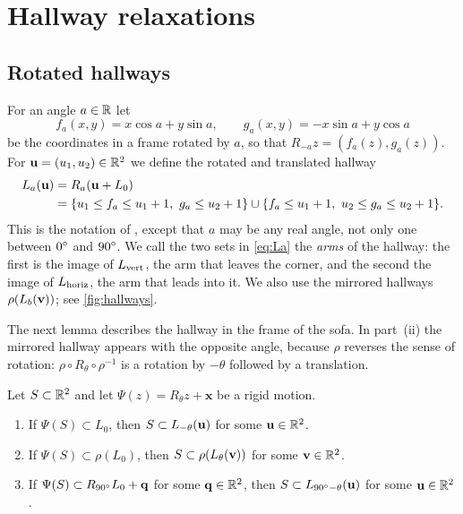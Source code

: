 \section{Hallway relaxations}\label{sec:relaxations}

\subsection{Rotated hallways}

For an angle $a\in\mathbb{R}$ let
\[
f_a(x,y)=x\cos a+y\sin a, \qquad g_a(x,y)=-x\sin a+y\cos a
\]
be the coordinates in a frame rotated by $a$, so that $R_{-a}z=(f_a(z),g_a(z))$. For $\mathbf{u}=(u_1,u_2)\in\mathbb{R}^2$ we define the rotated and translated hallway
\begin{equation}\label{eq:La}
\begin{split}
L_a(\mathbf{u})&=R_a(\mathbf{u}+L_0)\\
&=\{u_1\le f_a\le u_1+1,\ g_a\le u_2+1\}\cup\{f_a\le u_1+1,\ u_2\le g_a\le u_2+1\}.
\end{split}
\end{equation}
This is the notation of \cite{kallusromik2018}, except that $a$ may be any real angle, not only one between $0^{\circ}$ and $90^{\circ}$. We call the two sets in \eqref{eq:La} the \emph{arms} of the hallway: the first is the image of $L_{\mathrm{vert}}$, the arm that leaves the corner, and the second the image of $L_{\mathrm{horiz}}$, the arm that leads into it. We also use the mirrored hallways $\rho(L_b(\mathbf{v}))$; see \cref{fig:hallways}.

The next lemma describes the hallway in the frame of the sofa. In part~(ii) the mirrored hallway appears with the opposite angle, because $\rho$ reverses the sense of rotation: $\rho\circ R_\theta\circ\rho^{-1}$ is a rotation by $-\theta$ followed by a translation.

\begin{lem}\label{lem:frame}
Let $S\subset\mathbb{R}^2$ and let $\Psi(z)=R_\theta z+\mathbf{x}$ be a rigid motion.
\begin{enumerate}[label=(\roman*)]
\item If $\Psi(S)\subset L_0$, then $S\subset L_{-\theta}(\mathbf{u})$ for some $\mathbf{u}\in\mathbb{R}^2$.
\item If $\Psi(S)\subset\rho(L_0)$, then $S\subset\rho(L_{\theta}(\mathbf{v}))$ for some $\mathbf{v}\in\mathbb{R}^2$.
\item If $\Psi(S)\subset R_{90^{\circ}}L_0+\mathbf{q}$ for some $\mathbf{q}\in\mathbb{R}^2$, then $S\subset L_{90^{\circ}-\theta}(\mathbf{u})$ for some $\mathbf{u}\in\mathbb{R}^2$.
\end{enumerate}
\end{lem}

